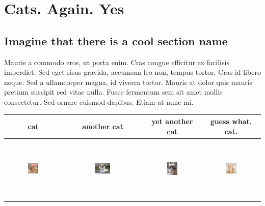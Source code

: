 \documentclass[10pt,a4paper]{report}
\begin{document}
\chapter{Cats. Again. Yes}
\section{Imagine that there is a cool section name}
Mauris a commodo eros, ut porta enim. Cras congue efficitur ex facilisis imperdiet. Sed eget risus gravida, accumsan leo non, tempus tortor. Cras id libero neque. Sed a ullamcorper magna, id viverra tortor. Mauris at dolor quis mauris pretium suscipit sed vitae nulla. Fusce fermentum sem sit amet mollis consectetur. Sed ornare euismod dapibus. Etiam at nunc mi.\cite{noble2004support} \\
\begin{tabular}{c | c | c | c}
    cat & another cat & yet another cat & guess what. cat. \\ \hline
    \includegraphics[width=0.2\textwidth, height=30mm]{images/1.jpg} & \includegraphics[width=0.2\textwidth, height=30mm]{images/2.jpg} & \includegraphics[width=0.2\textwidth, height=30mm]{images/3.jpg} & \includegraphics[width=0.2\textwidth, height=30mm]{images/4.jpg} \\
\end{tabular} \\
\end{document}
